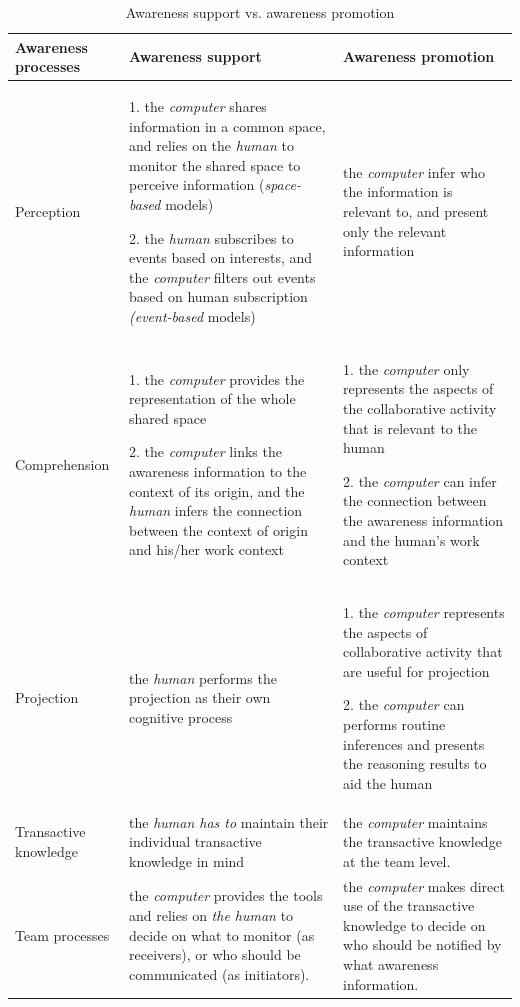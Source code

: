 \begin{table}[htbp]
\centering
\footnotesize
\begin{tabular}{>{\raggedright}p{1.1in}>{\raggedright}p{2.2in}>{\raggedright}p{2.2in}}

\toprule 
\textbf{Awareness processes} & \textbf{Awareness support} & \textbf{Awareness promotion}\tabularnewline
\midrule 
Perception & 1. the \emph{computer} shares information in a common space, and relies
on the \emph{human} to monitor the shared space to perceive information
(\emph{space-based} models)

2. the \emph{human} subscribes to events based on interests, and the
\emph{computer} filters out events based on human subscription\emph{
(event-based} models)  & the \emph{computer} infer who the information is relevant to, and
present only the relevant information\tabularnewline
\midrule 
Comprehension & 1. the \emph{computer} provides the representation of the whole shared
space

2. the \emph{computer} links the awareness information to the context
of its origin, and the \emph{human} infers the connection between
the context of origin and his/her work context & 1. the \emph{computer} only represents the aspects of the collaborative
activity that is relevant to the human

2. the \emph{computer} can infer the connection between the awareness
information and the human's work context\tabularnewline
\midrule 
Projection & the \emph{human} performs the projection as their own cognitive process & 1. the \emph{computer} represents the aspects of collaborative activity
that are useful for projection 

2. the \emph{computer} can performs routine inferences and presents
the reasoning results to aid the human\tabularnewline
\midrule 
Transactive knowledge & the \emph{human has to} maintain their individual transactive knowledge
in mind & the \emph{computer} maintains the transactive knowledge at the team
level.\tabularnewline
\midrule 
Team processes & the \emph{computer }provides the tools and relies on\emph{ the human}
to decide on what to monitor (as receivers), or who should be communicated
(as initiators). & the \emph{computer} makes direct use of the transactive knowledge
to decide on who should be notified by what awareness information.\tabularnewline
\bottomrule

\end{tabular}  
\caption{Awareness support vs. awareness promotion}
\label{tab:awareness_support_vs_promotion}
\end{table}

